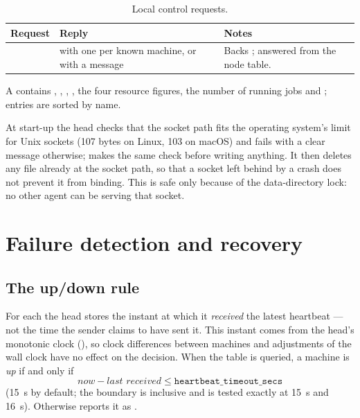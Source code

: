 \documentclass{article}
\begin{document}
\begin{table}[htbp]
  \centering
  \begin{tabular}{L{0.15\textwidth}L{0.4\textwidth}L{0.33\textwidth}}
    \hline
    Request & Reply & Notes \\
    \hline
      &  with one  per known machine, or
         with a message
      & Backs ; answered from the node table. \\
    \hline
  \end{tabular}
  \caption{Local control requests.}
  \label{tab:ipc}
\end{table}

A  contains , , ,
, the four resource figures, the number of
running jobs and ; entries are sorted by name.

At start-up the head checks that the socket path fits the operating
system's limit for Unix sockets (107 bytes on Linux, 103 on macOS) and
fails with a clear message otherwise;  makes the same
check before writing anything. It then deletes any file already at the
socket path, so that a socket left behind by a crash does not prevent it
from binding. This is safe only because of the data-directory lock: no
other agent can be serving that socket.

\section{Failure detection and recovery}

\subsection{The up/down rule}
\label{sec:updown}

For each  the head stores the instant at which it
\emph{received} the latest heartbeat --- not the time the sender claims to
have sent it. This instant comes from the head's monotonic clock
(), so clock differences between machines and
adjustments of the wall clock have no effect on the decision. When the
table is queried, a machine is \emph{up} if and only if
\[
  \textit{now} - \textit{last received} \le
  \texttt{heartbeat\_timeout\_secs}
\]
(15~s by default; the boundary is inclusive and is tested exactly at
15~s and 16~s). Otherwise  reports it as
.
\end{document}

